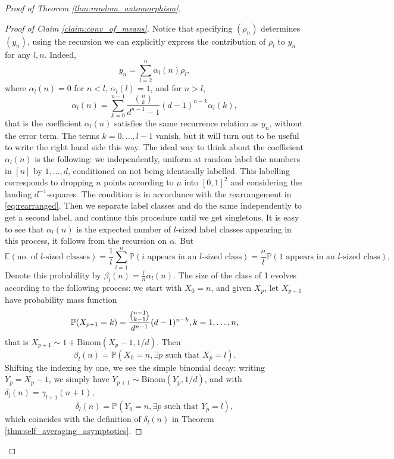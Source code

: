 \documentclass[11pt]{article}
\newcommand{\PP}{\mathbb{P}}
\newcommand{\EE}{\mathbb{E}}
\theoremstyle{definition}
\begin{document}
\begin{proof}[Proof of Theorem \ref{thm:random_automorphism}]
\begin{proof}[Proof of Claim \ref{claim:conv_of_means}]
    Notice that specifying $(\rho_n)$ determines $(y_n)$, using the recursion we can explicitly express the contribution of $\rho_l$ to $y_n$ for any $l, n$. Indeed,
    \begin{equation}\label{eq:recursion_y}
    y_n = \sum_{l=2}^{n}\alpha_l(n)\rho_l,
    \end{equation}
    where $\alpha_l(n)=0$ for $n<l$, $\alpha_l(l)=1$, and for $n>l$,
    \begin{equation}\label{eq:recursion_alpha}
        \alpha_l(n)=\sum_{k=0}^{n-1}\frac{\binom{n}{k}}{d^{n-1}-1}(d-1)^{n-k}\alpha_l(k),
    \end{equation}
    that is the coefficient $\alpha_l(n)$ satisfies the same recurrence relation as $y_n$, without the error term. The terms $k=0, \dots, l-1$ vanish, but it will turn out to be useful to write the right hand side this way. The ideal way to think about the coefficient $\alpha_l(n)$ is the following: we independently, uniform at random label the numbers in $[n]$ by $1, \dots, d$, conditioned on not being identically labelled. This labelling corresponds to dropping $n$ points according to  $\mu$ into $[0, 1]^2$ and considering the landing $d^{-1}$-squares. The condition is in accordance with the rearrangement in \eqref{eq:rearranged}. Then we separate label classes and do the same independently to get a second label, and continue this procedure until we get singletons. It is easy to see that $\alpha_l(n)$ is the expected number of $l$-sized label classes appearing in this process, it follows from the recursion on $\alpha$. But
    $$\EE(\text{no. of $l$-sized classes})=\frac{1}{l}\sum_{i=1}^n\PP(\text{$i$ appears in an $l$-sized class})=\frac{n}{l}\PP(\text{1 appears in an $l$-sized class}),$$
    Denote this probability by $\beta_l(n)=\frac{l}{n} \alpha_l(n)$. The size of the class of 1 evolves according to the following process: we start with $X_0 = n$, and given $X_p$, let $X_{p+1}$ have probability mass function $$\PP(X_{p+1}=k)= \frac{\binom{n-1}{k-1}}{d^{n-1}}(d-1)^{n-k}, \\ k=1, \dots, n,$$
    that is $X_{p+1}\sim 1+\mathrm{Binom}(X_p-1, 1/d)$.
    Then
    $$\beta_l(n)=\PP(X_0=n,\exists p\text{ such that }X_p=l).$$
    Shifting the indexing by one, we see the simple binomial decay:
    writing $Y_p = X_p -1$, we simply have $Y_{p+1} \sim \mathrm{Binom}(Y_p, 1/d)$, and with $\delta_l(n) = \gamma_{l+1}(n+1)$, 
    $$\delta_l(n)=\PP(Y_0=n,\exists p\text{ such that }Y_p=l),$$
    which coincides with the definition of $\delta_l(n)$ in Theorem \ref{thm:self_averaging_asymptotics}.


\end{proof}
\end{proof}
\end{document}
